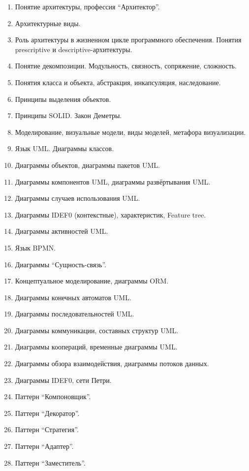 \documentclass[a5paper]{article}
\begin{document}
\begin{enumerate}
    \item Понятие архитектуры, профессия \enquote{Архитектор}.
    \item Архитектурные виды.
    \item Роль архитектуры в жизненном цикле программного обеспечения. Понятия prescriptive и descriptive-архитектуры.
    \item Понятие декомпозиции. Модульность, связность, сопряжение, сложность.
    \item Понятия класса и объекта, абстракция, инкапсуляция, наследование. 
    \item Принципы выделения объектов.
    \item Принципы SOLID. Закон Деметры.
    \item Моделирование, визуальные модели, виды моделей, метафора визуализации.
    \item Язык UML. Диаграммы классов.
    \item Диаграммы объектов, диаграммы пакетов UML.
    \item Диаграммы компонентов UML, диаграммы развёртывания UML.
    \item Диаграммы случаев использования UML.
    \item Диаграммы IDEF0 (контекстные), характеристик, Feature tree.
    \item Диаграммы активностей UML.
    \item Язык BPMN.
    \item Диаграммы \enquote{Сущность-связь}.
    \item Концептуальное моделирование, диаграммы ORM.
    \item Диаграммы конечных автоматов UML.
    \item Диаграммы последовательностей UML.
    \item Диаграммы коммуникации, составных структур UML.
    \item Диаграммы коопераций, временные диаграммы UML.
    \item Диаграммы обзора взаимодействия, диаграммы потоков данных.
    \item Диаграммы IDEF0, сети Петри.
    \item Паттерн \enquote{Компоновщик}.
    \item Паттерн \enquote{Декоратор}.
    \item Паттерн \enquote{Стратегия}.
    \item Паттерн \enquote{Адаптер}.
    \item Паттерн \enquote{Заместитель}.

\end{enumerate}
\end{document}
